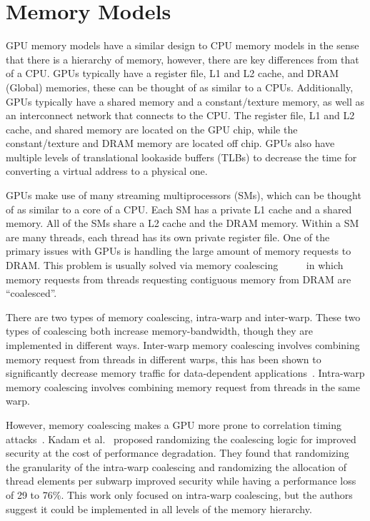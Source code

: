 \section{Memory Models}
GPU memory models have a similar design to CPU memory models in the sense that there is a hierarchy of memory, however, there are key differences from that of a CPU.
GPUs typically have a register file, L1 and L2 cache, and DRAM (Global) memories, these can be thought of as similar to a CPUs.
Additionally, GPUs typically have a shared memory and a constant/texture memory, as well as an interconnect network that connects to the CPU.
The register file, L1 and L2 cache, and shared memory are located on the GPU chip, while the constant/texture and DRAM memory are located off chip.
GPUs also have multiple levels of translational lookaside buffers (TLBs) to decrease the time for converting a virtual address to a physical one.

GPUs make use of many streaming multiprocessors (SMs), which can be thought of as similar to a core of a CPU.
Each SM has a private L1 cache and a shared memory.
All of the SMs share a L2 cache and the DRAM memory.
Within a SM are many threads, each thread has its own private register file.
One of the primary issues with GPUs is handling the large amount of memory requests to DRAM.
This problem is usually solved via memory coalescing~\cite{Jog2013OWL}~\cite{Bakhoda2009}~\cite{Singh2013}~\cite{Fung2011HPC}~\cite{Kadam2018} in which memory requests from threads requesting contiguous memory from DRAM are ``coalesced''.

There are two types of memory coalescing, intra-warp and inter-warp.
These two types of coalescing both increase memory-bandwidth, though they are implemented in different ways.
Inter-warp memory coalescing involves combining memory request from threads in different warps, this has been shown to significantly decrease memory traffic for data-dependent applications~\cite{Bakhoda2009}.
Intra-warp memory coalescing involves combining memory request from threads in the same warp.

However, memory coalescing makes a GPU more prone to correlation timing attacks~\cite{Kadam2018}. Kadam et al.~\cite{Kadam2018} proposed randomizing the coalescing logic for improved security at the cost of performance degradation.
They found that randomizing the granularity of the intra-warp coalescing and randomizing the allocation of thread elements per subwarp improved security while having a performance loss of 29 to 76\%.
This work only focused on intra-warp coalescing, but the authors suggest it could be implemented in all levels of the memory hierarchy.

